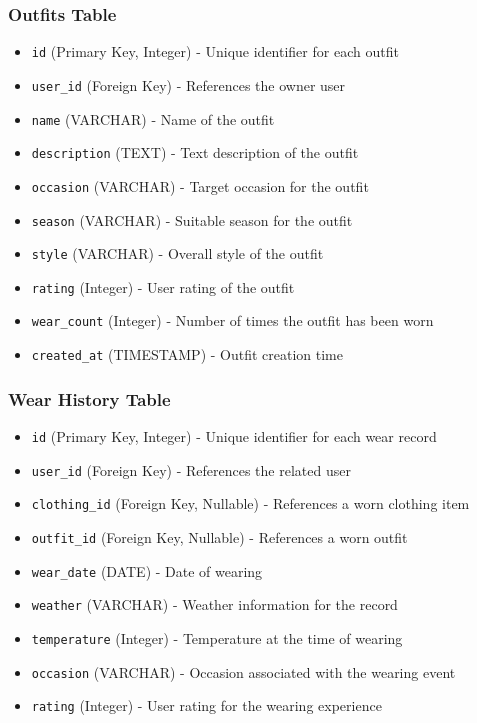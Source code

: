 \begin{appendices}
\subsubsection{Outfits Table}
\begin{itemize}
    \item \texttt{id} (Primary Key, Integer) - Unique identifier for each outfit
    \item \texttt{user\_id} (Foreign Key) - References the owner user
    \item \texttt{name} (VARCHAR) - Name of the outfit
    \item \texttt{description} (TEXT) - Text description of the outfit
    \item \texttt{occasion} (VARCHAR) - Target occasion for the outfit
    \item \texttt{season} (VARCHAR) - Suitable season for the outfit
    \item \texttt{style} (VARCHAR) - Overall style of the outfit
    \item \texttt{rating} (Integer) - User rating of the outfit
    \item \texttt{wear\_count} (Integer) - Number of times the outfit has been worn
    \item \texttt{created\_at} (TIMESTAMP) - Outfit creation time
\end{itemize}

\subsubsection{Wear History Table}
\begin{itemize}
    \item \texttt{id} (Primary Key, Integer) - Unique identifier for each wear record
    \item \texttt{user\_id} (Foreign Key) - References the related user
    \item \texttt{clothing\_id} (Foreign Key, Nullable) - References a worn clothing item
    \item \texttt{outfit\_id} (Foreign Key, Nullable) - References a worn outfit
    \item \texttt{wear\_date} (DATE) - Date of wearing
    \item \texttt{weather} (VARCHAR) - Weather information for the record
    \item \texttt{temperature} (Integer) - Temperature at the time of wearing
    \item \texttt{occasion} (VARCHAR) - Occasion associated with the wearing event
    \item \texttt{rating} (Integer) - User rating for the wearing experience
\end{itemize}


\end{appendices}
